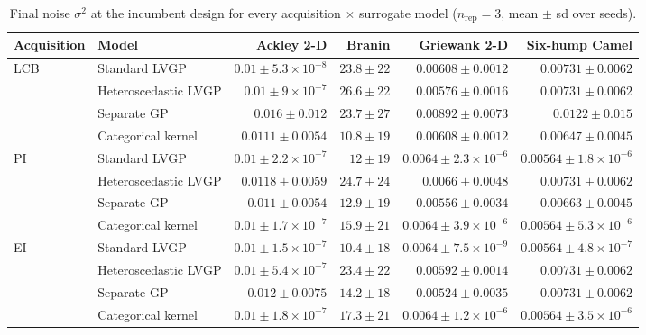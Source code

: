 \begin{table}[htbp]
\centering
\small
\setlength{\tabcolsep}{4pt}
\setlength{\fboxsep}{2pt}
\caption{Final noise $\sigma^2$ at the incumbent design for every acquisition $\times$ surrogate model ($n_{\mathrm{rep}}=3$, mean $\pm$ sd over seeds).}
\label{tab:noise_nrep03}
\begin{tabular}{llrrrr}
\toprule
Acquisition & Model & Ackley 2-D & Branin & Griewank 2-D & Six-hump Camel \\
\midrule
LCB & Standard LVGP & \colorbox{green!20}{{\boldmath$0.01 \pm 5.3{\times}10^{-8}$}} & $23.8 \pm 22$ & $0.00608 \pm 0.0012$ & $0.00731 \pm 0.0062$ \\
 & Heteroscedastic LVGP & $0.01 \pm 9{\times}10^{-7}$ & $26.6 \pm 22$ & {\boldmath$0.00576 \pm 0.0016$} & $0.00731 \pm 0.0062$ \\
 & Separate GP & $0.016 \pm 0.012$ & $23.7 \pm 27$ & $0.00892 \pm 0.0073$ & $0.0122 \pm 0.015$ \\
 & Categorical kernel & $0.0111 \pm 0.0054$ & {\boldmath$10.8 \pm 19$} & $0.00608 \pm 0.0012$ & {\boldmath$0.00647 \pm 0.0045$} \\
\midrule
PI & Standard LVGP & $0.01 \pm 2.2{\times}10^{-7}$ & {\boldmath$12 \pm 19$} & $0.0064 \pm 2.3{\times}10^{-6}$ & \colorbox{green!20}{{\boldmath$0.00564 \pm 1.8{\times}10^{-6}$}} \\
 & Heteroscedastic LVGP & $0.0118 \pm 0.0059$ & $24.7 \pm 24$ & $0.0066 \pm 0.0048$ & $0.00731 \pm 0.0062$ \\
 & Separate GP & $0.011 \pm 0.0054$ & $12.9 \pm 19$ & {\boldmath$0.00556 \pm 0.0034$} & $0.00663 \pm 0.0045$ \\
 & Categorical kernel & {\boldmath$0.01 \pm 1.7{\times}10^{-7}$} & $15.9 \pm 21$ & $0.0064 \pm 3.9{\times}10^{-6}$ & $0.00564 \pm 5.3{\times}10^{-6}$ \\
\midrule
EI & Standard LVGP & {\boldmath$0.01 \pm 1.5{\times}10^{-7}$} & {\boldmath$10.4 \pm 18$} & $0.0064 \pm 7.5{\times}10^{-9}$ & $0.00564 \pm 4.8{\times}10^{-7}$ \\
 & Heteroscedastic LVGP & $0.01 \pm 5.4{\times}10^{-7}$ & $23.4 \pm 22$ & $0.00592 \pm 0.0014$ & $0.00731 \pm 0.0062$ \\
 & Separate GP & $0.012 \pm 0.0075$ & $14.2 \pm 18$ & {\boldmath$0.00524 \pm 0.0035$} & $0.00731 \pm 0.0062$ \\
 & Categorical kernel & $0.01 \pm 1.8{\times}10^{-7}$ & $17.3 \pm 21$ & $0.0064 \pm 1.2{\times}10^{-6}$ & {\boldmath$0.00564 \pm 3.5{\times}10^{-6}$} \\

\end{tabular}
\end{table}
